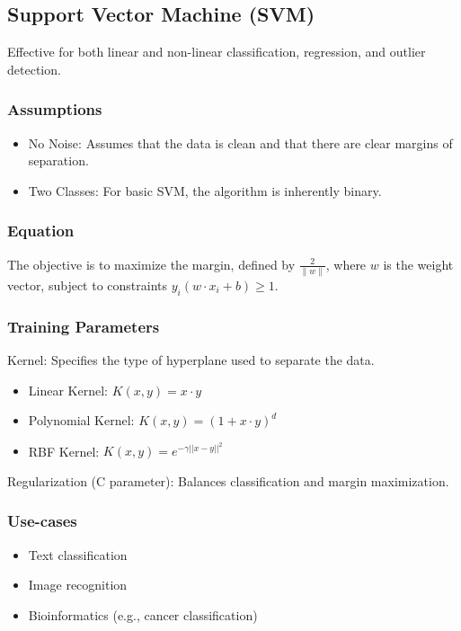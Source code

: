 \documentclass[english]{latex4ei/latex4ei_sheet}
\begin{document}
\begin{sectionbox}
\subsection{Support Vector Machine (SVM)}

Effective for both linear and non-linear classification, regression, and outlier detection.

\subsubsection{Assumptions}
\begin{itemize}
    \item No Noise: Assumes that the data is clean and that there are clear margins of separation.
    \item Two Classes: For basic SVM, the algorithm is inherently binary.
\end{itemize}

\subsubsection{Equation}
The objective is to maximize the margin, defined by \( \frac{2}{\|w\|} \), where \(w\) is the weight vector, subject to constraints \( y_i(w \cdot x_i + b) \geq 1 \).

\subsubsection{Training Parameters}
Kernel: Specifies the type of hyperplane used to separate the data.
\begin{itemize}
    \item Linear Kernel: \(K(x, y) = x \cdot y\)
    \item Polynomial Kernel: \(K(x, y) = (1 + x \cdot y)^d\)
    \item RBF Kernel: \(K(x, y) = e^{-\gamma ||x-y||^2}\)
\end{itemize}
Regularization (C parameter): Balances classification and margin maximization. 

\subsubsection{Use-cases}
\begin{itemize}
    \item Text classification
    \item Image recognition
    \item Bioinformatics (e.g., cancer classification)
\end{itemize}


\end{sectionbox}
\end{document}
